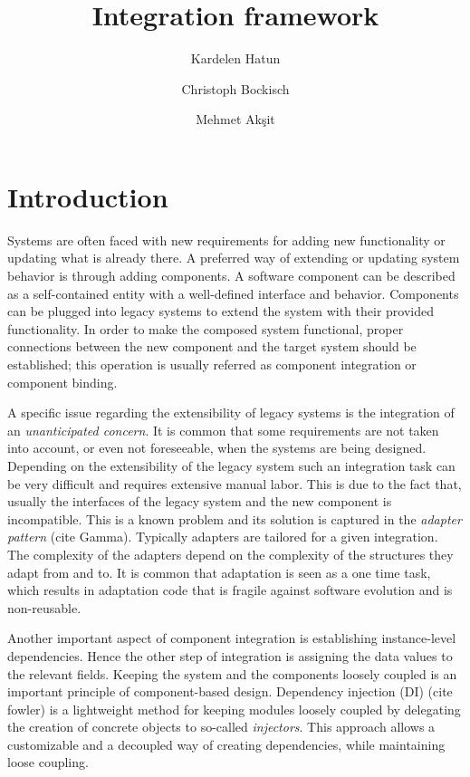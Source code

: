 \documentclass{llncs}
\begin{document}
\title{Integration framework}

\author{Kardelen Hatun \and Christoph Bockisch \and Mehmet Ak\c{s}it}
\maketitle

\section{Introduction}
Systems are often faced with new requirements for adding new functionality or updating what is already there. 
A preferred way of extending or updating system behavior is through adding components. 
A software component can be described as a self-contained entity with a well-defined interface and behavior. 
Components can be plugged into legacy systems to extend the system with their provided functionality.
In order to make the composed system functional, proper connections between the new component and the target system should be established; this operation is usually referred as component integration or component binding. 


A specific issue regarding the extensibility of legacy systems is the integration of an \emph{unanticipated concern}. 
It is common that some requirements are not taken into account, or even not foreseeable, when the systems are being designed. 
Depending on the extensibility of the legacy system such an integration task can be very difficult and requires extensive manual labor. 
This is due to the fact that, usually the interfaces of the legacy system and the new component is incompatible. 
This is a known problem and its solution is captured in the \emph{adapter pattern} (cite Gamma). 
Typically adapters are tailored for a given integration. 
The complexity of the adapters depend on the complexity of the structures they adapt from and to. 
It is common that adaptation is seen as a one time task, which results in adaptation code that is fragile against software evolution and is non-reusable. 


Another important aspect of component integration is establishing instance-level dependencies. 
Hence the other step of integration is assigning the data values to the relevant fields.
Keeping the system and the components loosely coupled is an important principle of component-based design. 
Dependency injection (DI) (cite fowler) is a lightweight method for keeping modules loosely coupled by delegating the creation of concrete objects to so-called \emph{injectors}. This approach allows a customizable and a decoupled way of creating dependencies, while maintaining loose coupling.
\end{document}
